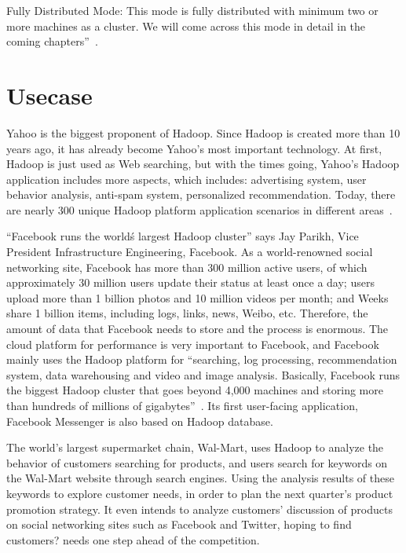 Fully Distributed Mode: This mode is fully distributed with minimum two or more 
machines as a cluster. We will come across this mode in detail in the coming 
chapters''~\cite{hid-sp18-508-hadoop}. 


\section{Usecase}
Yahoo is the biggest proponent of Hadoop. Since Hadoop is created more than 10 
years ago, it has already become Yahoo's most important technology. At first, 
Hadoop is just used as Web searching, but with the times going, Yahoo's Hadoop 
application includes more aspects, which includes: advertising system, user 
behavior analysis, anti-spam system, personalized recommendation. Today, there 
are nearly 300 unique Hadoop platform application scenarios in different 
areas~\cite{hid-sp18-508-yahoo}.

``Facebook runs the world\'s largest Hadoop cluster'' says Jay Parikh, Vice President 
Infrastructure Engineering, Facebook. As a world-renowned social networking site, Facebook has 
more than 300 million active users, of which approximately 30 million users update 
their status at least once a day; users upload more than 1 billion photos and 10 
million videos per month; and Weeks share 1 billion items, including logs, links, 
news, Weibo, etc. Therefore, the amount of data that Facebook needs to store and 
the process is enormous. The cloud platform for performance is very important to Facebook, 
and Facebook mainly uses the Hadoop platform for ``searching, log processing, 
recommendation system, data warehousing and video and image analysis. Basically, 
Facebook runs the biggest Hadoop cluster that goes beyond 4,000 machines and storing 
more than hundreds of millions of gigabytes''~\cite{hid-sp18-508-fb}. Its first 
user-facing application, Facebook Messenger is also based on Hadoop database.

The world's largest supermarket chain, Wal-Mart, uses Hadoop to analyze the behavior 
of customers searching for products, and users search for keywords on the Wal-Mart 
website through search engines. Using the analysis results of these keywords to 
explore customer needs, in order to plan the next quarter's product promotion strategy. 
It even intends to analyze customers' discussion of products on social networking 
sites such as Facebook and Twitter, hoping to find customers? needs one step ahead 
of the competition.




